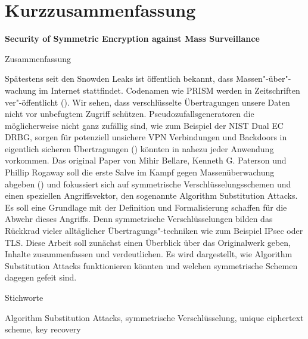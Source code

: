 \chapter*{Kurzzusammenfassung}

\begin{centering}
\textbf { \LARGE
Security of Symmetric Encryption against Mass Surveillance
\\[1.2cm]
}
\end{centering}

{\large
Zusammenfassung
}

{
Spätestens seit den Snowden Leaks ist öffentlich bekannt, dass Massen"-über"-wachung im Internet stattfindet. Codenamen wie PRISM werden in Zeitschriften ver"-öffentlicht (\cite{Guard}). Wir sehen, dass verschlüsselte Übertragungen unsere Daten nicht vor unbefugtem Zugriff schützen. Pseudozufallsgeneratoren die möglicherweise nicht ganz zufällig sind, wie zum Beispiel der NIST Dual EC DRBG, sorgen für potenziell unsichere VPN Verbindungen und Backdoors in eigentlich sicheren Übertragungen (\cite{dual}) könnten in nahezu jeder Anwendung vorkommen. Das original Paper von Mihir Bellare, Kenneth G. Paterson und Phillip Rogaway soll die erste Salve im Kampf gegen Massenüberwachung abgeben (\cite{praesi}) und fokussiert sich auf symmetrische Verschlüsselungsschemen und einen speziellen Angriffsvektor, den sogenannte Algorithm Substitution Attacks. Es soll eine Grundlage mit der Definition und Formalisierung schaffen für die Abwehr dieses Angriffs. Denn symmetrische Verschlüsselungen bilden das Rückkrad vieler alltäglicher Übertragungs"-techniken wie zum Beispiel IPsec oder TLS. Diese Arbeit soll zunächst einen Überblick über das Originalwerk geben, Inhalte zusammenfassen und verdeutlichen. Es wird dargestellt, wie Algorithm Substitution Attacks funktionieren könnten und welchen symmetrische Schemen dagegen gefeit sind.
}\vspace{12pt}

{\large
Stichworte
}

{
Algorithm Substitution Attacks, symmetrische Verschlüsselung, unique ciphertext scheme, key recovery
}